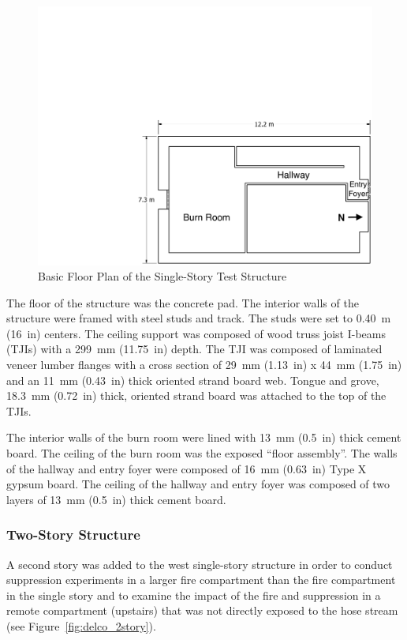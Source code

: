 \documentclass[12pt,oneside]{book}
\begin{document}
\begin{figure}[!ht]
	\includegraphics[width=\columnwidth]{../Figures/Floor_Plans/PDFs/East_Structure/DelCo_2012_East_Structure_Plain}
	\caption{Basic Floor Plan of the Single-Story Test Structure}
	\label{fig:Test_Structure_Floor_Plan}
\end{figure}

The floor of the structure was the concrete pad. The interior walls of the structure were framed with steel studs and track. The studs were set to 0.40~m (16~in) centers. The ceiling support was composed of wood truss joist I-beams (TJIs) with a 299~mm (11.75~in) depth. The TJI was composed of laminated veneer lumber flanges with a cross section of 29~mm (1.13~in) x 44~mm (1.75~in) and an 11~mm (0.43~in) thick oriented strand board web. Tongue and grove, 18.3~mm (0.72~in) thick, oriented strand board was attached to the top of the TJIs.

The interior walls of the burn room were lined with 13~mm (0.5~in) thick cement board. The ceiling of the burn room was the exposed ``floor assembly''. The walls of the hallway and entry foyer were composed of 16~mm (0.63~in) Type X gypsum board. The ceiling of the hallway and entry foyer was composed of two layers of 13~mm (0.5~in) thick cement board.

\subsubsection*{Two-Story Structure}

A second story was added to the west single-story structure in order to conduct suppression experiments in a larger fire compartment than the fire compartment in the single story and to examine the impact of the fire and suppression in a remote compartment (upstairs) that was not directly exposed to the hose stream (see Figure~\ref{fig:delco_2story}).
\end{document}
